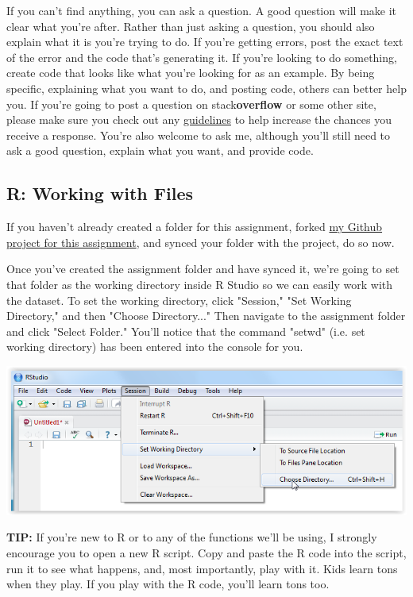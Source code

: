 \documentclass[12pt]{article}
\begin{document}
If you can't find anything, you can ask a question. A good question will 
make it clear what you're after. Rather than just asking a question, you should
also explain what it is you're trying to do. If you're getting errors, post the
exact text of the error and the code that's generating it. If you're looking to
do something, create code that looks like what you're looking for as an example.
By being specific, explaining what you want to do, and posting code, others can
better help you. If you're going to post a question on stack\textbf{overflow} or
some other site, please make sure you check out any
\href{http://stackoverflow.com/help/how-to-ask}{guidelines} to help increase the
chances you receive a response. You're also welcome to ask me, although you'll
still need to ask a good question, explain what you want, and provide code.

\subsection{R: Working with Files}
If you haven't already created a folder for this assignment, forked
\href{GITHUBPROJECT}{my Github project for this assignment}, and synced your
folder with the project, do so now.

Once you've created the assignment folder and have synced it, we're going to set
that folder as the working directory inside R Studio so we can easily work
with the dataset. To set the working directory, click "Session," "Set Working
Directory," and then "Choose Directory..." Then navigate to the assignment
folder and click "Select Folder." You'll notice that the command "setwd" (i.e.
set working directory) has been entered into the console for you.

\includegraphics{imgs/R09.PNG}

\textbf{TIP:} If you're new to R or to any of the functions we'll be using, I
strongly encourage you to open a new R script. Copy and paste the R code into
the script, run it to see what happens, and, most importantly, play with it.
Kids learn tons when they play. If you play with the R code, you'll learn tons
too.
\end{document}
